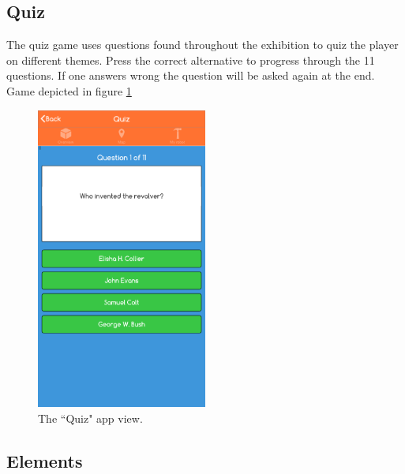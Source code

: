 \subsection{Quiz}
The quiz game uses questions found throughout the exhibition to quiz the player on different themes. Press the correct alternative to progress through the 11 questions. If one answers wrong the question will be asked again at the end. Game depicted in figure \ref{fig:Quiz}
\begin{figure}[H]
    \centering
    \includegraphics[width=0.5\textwidth]{images/app/Quiz.png}
    \caption{The ``Quiz" app view.}
    \label{fig:Quiz}
\end{figure}

\subsection{Elements}

